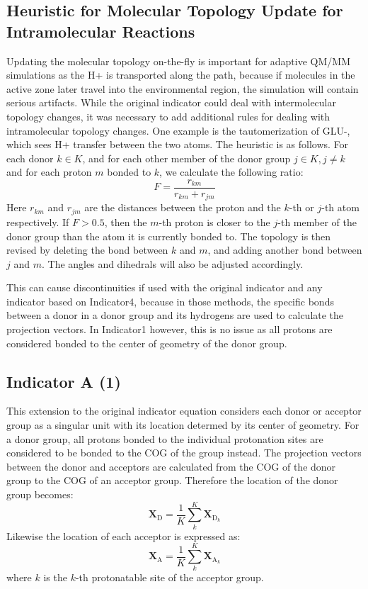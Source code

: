 \documentclass{article}
\newcommand{\mb}[1]{\mathbf{#1}}
\newcommand{\mr}[1]{\mathrm{#1}}
\begin{document}
\subsection{Heuristic for Molecular Topology Update for Intramolecular Reactions}\label{ss:topo_change}
Updating the molecular topology on-the-fly is important for adaptive QM/MM simulations as the H+ is transported along the path, because if molecules in the active zone later travel into the environmental region, the simulation will contain serious artifacts.
While the original indicator could deal with intermolecular topology changes, it was necessary to add additional rules for dealing with intramolecular topology changes.
One example is the tautomerization of GLU-, which sees H+ transfer between the two atoms.
The heuristic is as follows.
For each donor $k \in K$, and for each other member of the donor group $j \in K, j \ne k$ and for each proton $m$ bonded to $k$, we calculate the following ratio:
\begin{equation}
F = \frac{r_{km}}{r_{km} + r_{jm}}
\end{equation}
Here $r_{km}$ and $r_{jm}$ are the distances between the proton and the $k$-th or $j$-th atom respectively.
If $F > 0.5$, then the $m$-th proton is closer to the $j$-th member of the donor group than the atom it is currently bonded to.
The topology is then revised by deleting the bond between $k$ and $m$, and adding another bond between $j$ and $m$.
The angles and dihedrals will also be adjusted accordingly.

This can cause discontinuities if used with the original indicator and any indicator based on Indicator4, because in those methods, the specific bonds between a donor in a donor group and its hydrogens are used to calculate the projection vectors.
In Indicator1 however, this is no issue as all protons are considered bonded to the center of geometry of the donor group.

\subsection{Indicator A (1)}\label{ss:ind_a}
This extension to the original indicator equation considers each donor or acceptor group as a singular unit with its location determed by its center of geometry.
For a donor group, all protons bonded to the individual protonation sites are considered to be bonded to the COG of the group instead.
The projection vectors between the donor and acceptors are calculated from the COG of the donor group to the COG of an acceptor group.
Therefore the location of the donor group becomes:
\begin{equation}\label{eq:donor_cog}
\mb{X}_{\mr{D}} = \frac{1}{K}\sum_k^K \mb{X}_{\mr{D}_k}
\end{equation}
Likewise the location of each acceptor is expressed as:
\begin{equation}
\mb{X}_{\mr{A}} = \frac{1}{K}\sum_k^K \mb{X}_{\mr{A}_k}
\end{equation}
where $k$ is the $k$-th protonatable site of the acceptor group.
\end{document}
